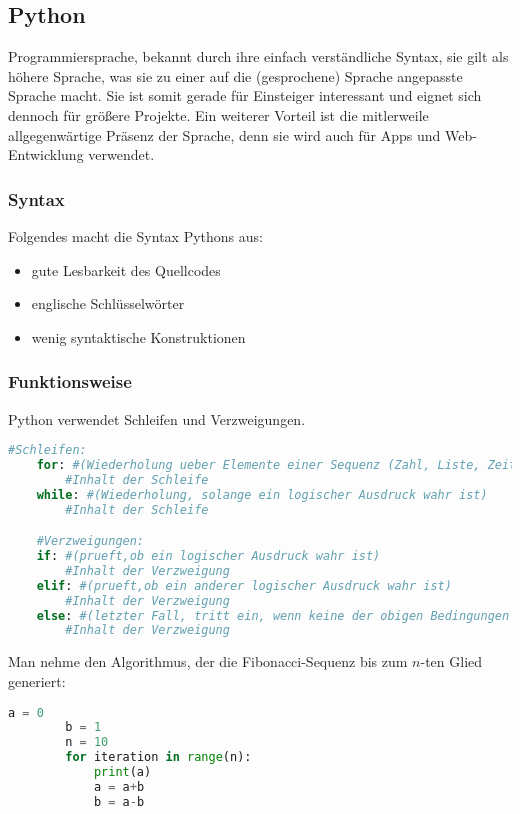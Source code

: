 \documentclass[main.tex]{subfiles}
\begin{document}
\subsection{Python}
Programmiersprache, bekannt durch ihre einfach verständliche Syntax, sie gilt als höhere Sprache, was sie zu einer auf die (gesprochene) Sprache angepasste Sprache macht. Sie ist somit gerade für Einsteiger interessant und eignet sich dennoch für größere Projekte. Ein weiterer Vorteil ist die mitlerweile allgegenwärtige Präsenz der Sprache, denn sie wird auch für Apps und Web-Entwicklung verwendet.\\

\subsubsection{Syntax}
Folgendes macht die Syntax Pythons aus:\\
\begin{itemize}
\item gute Lesbarkeit des Quellcodes
\item englische Schlüsselwörter
\item wenig syntaktische Konstruktionen
\end{itemize}

\subsubsection{Funktionsweise}
Python verwendet Schleifen und Verzweigungen.\\
\begin{lstlisting}[language=Python]
	#Schleifen:
	for: #(Wiederholung ueber Elemente einer Sequenz (Zahl, Liste, Zeit...))
		#Inhalt der Schleife
	while: #(Wiederholung, solange ein logischer Ausdruck wahr ist)
		#Inhalt der Schleife

	#Verzweigungen:
	if: #(prueft,ob ein logischer Ausdruck wahr ist)
		#Inhalt der Verzweigung
	elif: #(prueft,ob ein anderer logischer Ausdruck wahr ist)
		#Inhalt der Verzweigung
	else: #(letzter Fall, tritt ein, wenn keine der obigen Bedingungen erfuellt wurde)
		#Inhalt der Verzweigung
\end{lstlisting}
\begin{Beispiel}
	Man nehme den Algorithmus, der die Fibonacci-Sequenz bis zum $n$-ten Glied generiert:\\
	\begin{lstlisting}[language=Python]
		a = 0
		b = 1
		n = 10
		for iteration in range(n):
			print(a)
			a = a+b
			b = a-b
	\end{lstlisting}
\end{Beispiel}
\end{document}
